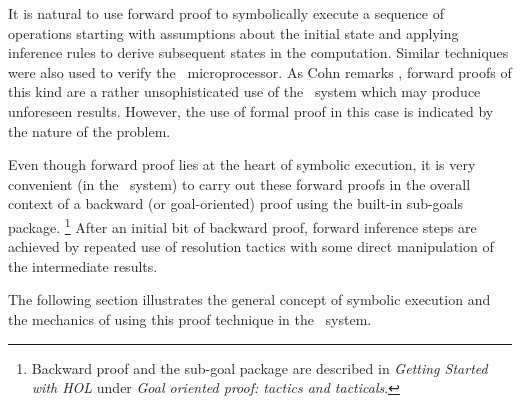 It is natural
to use forward proof to symbolically execute a sequence of operations
starting with assumptions
about the initial state and applying inference rules
to derive subsequent states in the computation.
Similar techniques were also used to verify the \Viper\ microprocessor.
As Cohn remarks \cite{Cohn:banff87},
forward proofs of this kind
are a rather unsophisticated use of the \HOL\ system
which may produce unforeseen results.
However, the use of formal proof in this
case is indicated by the nature of the problem.

Even though forward proof lies at the heart of
symbolic execution,
it is very convenient (in the \HOL\ system)
to carry out these forward proofs
in the overall
context of a backward (or goal-oriented) proof using
the built-in sub-goals package.
\footnote{
Backward proof and the sub-goal package are described
in {\it Getting Started with HOL} under
{\it Goal oriented proof: tactics and tacticals}.}
After an initial bit of backward proof,
forward inference steps are achieved by repeated use of resolution
tactics with some direct manipulation of the intermediate results.

The following section
illustrates the general concept of symbolic execution and
the mechanics of using this proof technique in the \HOL\ system.
